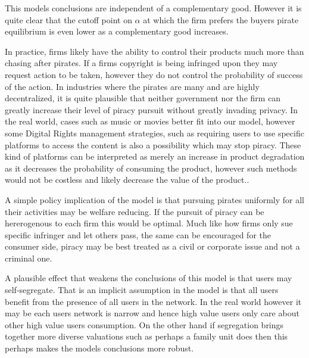 \documentclass{article}
\begin{document}
This models conclusions are independent of a complementary good. However it is quite clear that the cutoff point on $\alpha$ at which the firm prefers the buyers pirate equilibrium is even lower as a complementary good increases. 


In practice, firms likely have the ability to control their products much more than chasing after pirates. If a firms copyright is being infringed upon they may request action to be taken, however they do not control the probability of success of the action. In industries where the pirates are many and are highly decentralized, it is quite plausible that neither government nor the firm can greatly increase their level of piracy pursuit without greatly invading privacy. In the real world, cases such as music or movies better fit into our model, however some Digital Rights management strategies, such as requiring users to use specific platforms to access the content is also a possibility which may stop piracy. These kind of platforms can be interpreted as merely an increase in product degradation as it decreases the probability of consuming the product, however such methods would not be costless and likely decrease the value of the product.\citep{S04}. 

A simple policy implication of the model is that pursuing pirates uniformly for all their activities may be welfare reducing. If the pursuit of piracy can be hererogenous to each firm this would be optimal. Much like how firms only sue specific infringer and let others pass, the same can be encouraged for the consumer side, piracy may be best treated as a civil or corporate issue and not a criminal one.

A plausible effect that weakens the conclusions of this model is that users may self-segregate. That is an implicit assumption in the model is that all users benefit from the presence of all users in the network. In the real world however it may be each users network is narrow and hence high value users only care about other high value users consumption. On the other hand if segregation brings together more diverse valuations such as perhaps a family unit does then this perhaps makes the models conclusions more robust. 
\end{document}
